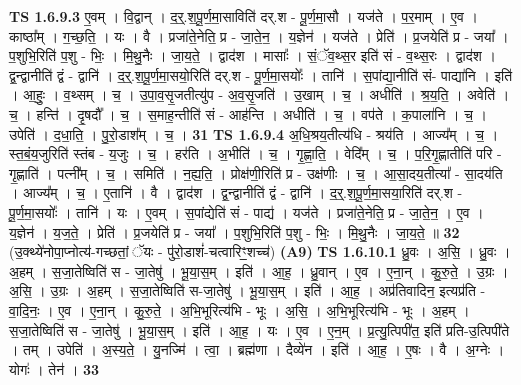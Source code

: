 \documentclass[17pt]{extarticle}
\begin{document}
                  \newline
                                \textbf{ TS 1.6.9.3} \newline
                  ए॒वम् । वि॒द्वान् । द॒र्॒.श॒पू॒र्ण॒मा॒साविति॑ दर्.श - पू॒र्ण॒मा॒सौ । यज॑ते । प॒र॒माम् । ए॒व । काष्ठा᳚म् । ग॒च्छ॒ति॒ । यः । वै । प्रजा॑ते॒नेति॒ प्र - जा॒ते॒न॒ । य॒ज्ञेन॑ । यज॑ते । प्रेति॑ । प्र॒जयेति॑ प्र - जया᳚ । प॒शुभि॒रिति॑ प॒शु - भिः॒ । मि॒थु॒नैः । जा॒य॒ते॒ । द्वाद॑श । मासाः᳚ । सं॒ॅव॒थ्स॒र इति॑ सं - व॒थ्स॒रः । द्वाद॑श । द्व॒न्द्वानीति॑ द्वं - द्वानि॑ । द॒र्॒.श॒पू॒र्ण॒मा॒सयो॒रिति॑ दर्.श - पू॒र्ण॒मा॒सयोः᳚ । तानि॑ । स॒पांद्या॒नीति॑ सं- पाद्या॑नि । इति॑ । आ॒हुः॒ । व॒थ्सम् । च॒ । उ॒पा॒व॒सृ॒जतीत्यु॑प - अ॒व॒सृ॒जति॑ । उ॒खाम् । च॒ । अधीति॑ । श्र॒य॒ति॒ । अवेति॑ । च॒ । हन्ति॑ । दृ॒षदौ᳚ । च॒ । स॒माह॒न्तीति॑ सं - आह॑न्ति । अधीति॑ । च॒ । वप॑ते । क॒पाला॑नि । च॒ । उपेति॑ । द॒धा॒ति॒ । पु॒रो॒डाश᳚म् । च॒ । \textbf{  31} \newline
                  \newline
                                \textbf{ TS 1.6.9.4} \newline
                  अ॒धि॒श्रय॒तीत्य॑धि - श्रय॑ति । आज्य᳚म् । च॒ । स्त॒बं॒य॒जुरिति॑ स्तंब - य॒जुः । च॒ । हर॑ति । अ॒भीति॑ । च॒ । गृ॒ह्णा॒ति॒ । वेदि᳚म् । च॒ । प॒रि॒गृ॒ह्णातीति॑ परि - गृ॒ह्णाति॑ । पत्नी᳚म् । च॒ । समिति॑ । न॒ह्य॒ति॒ । प्रोक्ष॑णी॒रिति॑ प्र - उक्ष॑णीः । च॒ । आ॒सा॒दय॒तीत्या᳚ - सा॒दय॑ति । आज्य᳚म् । च॒ । ए॒तानि॑ । वै । द्वाद॑श । द्व॒न्द्वानीति॑ द्वं - द्वानि॑ । द॒र्॒.श॒पू॒र्ण॒मा॒सया॒रिति॑ दर्.श - पू॒र्ण॒मा॒सयोः᳚ । तानि॑ । यः । ए॒वम् । स॒पांद्येति॑ सं - पाद्य॑ । यज॑ते । प्रजा॑ते॒नेति॒ प्र - जा॒ते॒न॒ । ए॒व । य॒ज्ञेन॑ । य॒ज॒ते॒ । प्रेति॑ । प्र॒जयेति॑ प्र - जया᳚ । प॒शुभि॒रिति॑ प॒शु - भिः॒ । मि॒थु॒नैः । जा॒य॒ते॒ ॥ \textbf{  32} \newline
                  \newline
                      (उ॒क्थ्ये॑नोपा॒प्नोत्य॑-गच्छतां॒ ॅयः - पु॑रो॒डाशं॑-चत्वारिꣳ॒॒शच्च॑)  \textbf{(A9)} \newline \newline
                                \textbf{ TS 1.6.10.1} \newline
                  ध्रु॒वः । अ॒सि॒ । ध्रु॒वः । अ॒हम् । स॒जा॒तेष्विति॑ स - जा॒तेषु॑ । भू॒या॒स॒म् । इति॑ । आ॒ह॒ । ध्रु॒वान् । ए॒व । ए॒ना॒न् । कु॒रु॒ते॒ । उ॒ग्रः । अ॒सि॒ । उ॒ग्रः । अ॒हम् । स॒जा॒तेष्विति॑ स-जा॒तेषु॑ । भू॒या॒स॒म् । इति॑ । आ॒ह॒ । अप्र॑तिवादिन॒ इत्यप्र॑ति - वा॒दि॒नः॒ । ए॒व । ए॒ना॒न् । कु॒रु॒ते॒ । अ॒भि॒भूरित्य॑भि - भूः । अ॒सि॒ । अ॒भि॒भूरित्य॑भि - भूः । अ॒हम् । स॒जा॒तेष्विति॑ स - जा॒तेषु॑ । भू॒या॒स॒म् । इति॑ । आ॒ह॒ । यः । ए॒व । ए॒न॒म् । प्र॒त्यु॒त्पिपी॑त॒ इति॑ प्रति-उ॒त्पिपी॑ते । तम् । उपेति॑ । अ॒स्य॒ते॒ । यु॒नज्मि॑ । त्वा॒ । ब्रह्म॑णा । दैव्ये॑न । इति॑ । आ॒ह॒ । ए॒षः । वै । अ॒ग्नेः । योगः॑ । तेन॑ । \textbf{  33} \newline
\end{document}
